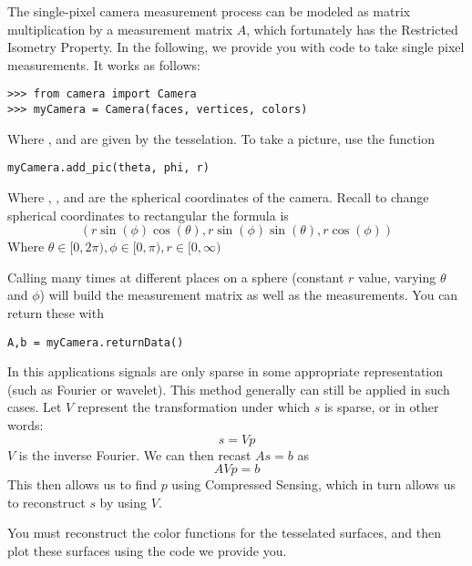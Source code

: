 The single-pixel camera measurement process can be modeled as matrix multiplication by a measurement matrix $A$, which fortunately has the Restricted Isometry Property.
In the following, we provide you with code to take single pixel measurements.
It works as follows:
\begin{lstlisting}
>>> from camera import Camera
>>> myCamera = Camera(faces, vertices, colors)
\end{lstlisting}
Where ,  and  are given by the tesselation. To take a picture, use the function
\begin{lstlisting}
myCamera.add_pic(theta, phi, r)
\end{lstlisting}
Where , , and  are the spherical coordinates of the camera.
Recall to change spherical coordinates to rectangular the formula is
\[
(r\sin(\phi)\cos(\theta),r\sin(\phi)\sin(\theta),r\cos(\phi))
\]
Where $\theta \in [0,2\pi),\phi \in [0,\pi), r \in [0,\infty)$

Calling  many times at different places on a sphere (constant $r$ value, varying $\theta$ and $\phi$) will build the measurement matrix as well as the measurements.
You can return these with
\begin{lstlisting}
A,b = myCamera.returnData()
\end{lstlisting}

In this applications signals are only sparse in some appropriate representation (such as Fourier or wavelet). This method generally can still be applied in such cases.
Let $V$ represent the transformation under which $s$ is sparse, or in other words:
\begin{equation}
s = V p
\end{equation}
$V$ is the inverse Fourier. We can then recast $A s=b$ as
\begin{equation}
A V p = b
\end{equation}
This then allows us to find $p$ using Compressed Sensing, which in turn allows us to reconstruct $s$ by using $V$.

You must reconstruct the color functions for the tesselated surfaces, and then plot these surfaces using the code we provide you.

